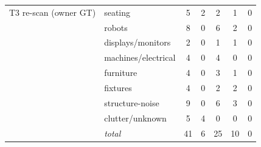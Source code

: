 \documentclass[electronics,article,accept,pdftex,moreauthors]{Definitions/mdpi}
\begin{document}
\begin{table}[H]
\begin{tabularx}{\textwidth}{m{3.4cm}<{\centering}m{3.3cm}<{\centering}cCCCC}
\midrule
T3 re-scan (owner GT) & seating & 5 & 2 & 2 & 1 & 0 \\
 & robots & 8 & 0 & 6 & 2 & 0 \\
 & displays/monitors & 2 & 0 & 1 & 1 & 0 \\
 & machines/electrical & 4 & 0 & 4 & 0 & 0 \\
 & furniture & 4 & 0 & 3 & 1 & 0 \\
 & fixtures & 4 & 0 & 2 & 2 & 0 \\
 & structure-noise & 9 & 0 & 6 & 3 & 0 \\
 & clutter/unknown & 5 & 4 & 0 & 0 & 0 \\
 & \emph{total} & 41 & 6 & 25 & 10 & 0 \\
\bottomrule
\end{tabularx}
\end{table}
\end{document}
